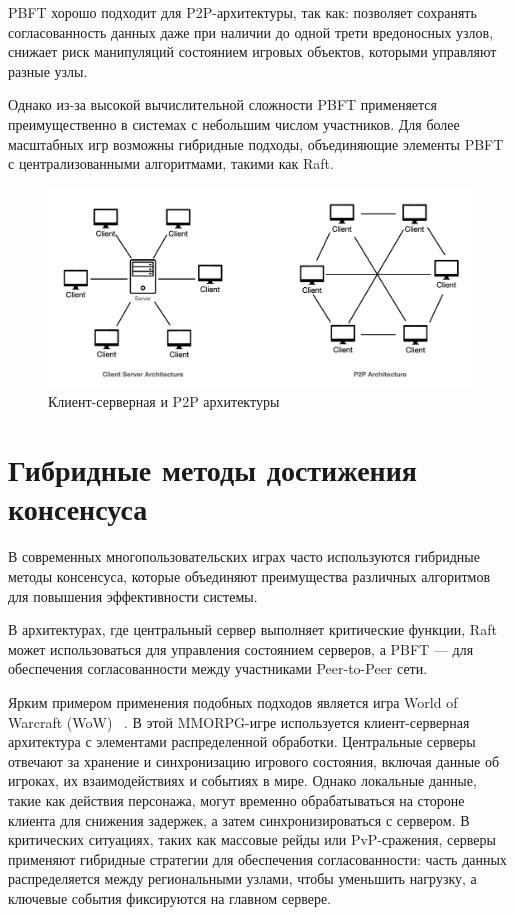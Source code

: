 PBFT хорошо подходит для P2P-архитектуры, так как: позволяет сохранять согласованность данных даже при наличии до одной трети вредоносных узлов, снижает риск манипуляций состоянием игровых объектов, которыми управляют разные узлы.

Однако из-за высокой вычислительной сложности PBFT применяется преимущественно в системах с небольшим числом участников. Для более масштабных игр возможны гибридные подходы, объединяющие элементы PBFT с централизованными алгоритмами, такими как Raft.

\begin{figure}[H]
	\centering
	\includegraphics[width=1\textwidth]{img/1.png}
	\caption{Клиент-серверная и P2P архитектуры}
	\label{img:2}
\end{figure}

\chapter{Гибридные методы достижения консенсуса}
В современных многопользовательских играх часто используются гибридные методы консенсуса, которые объединяют преимущества различных алгоритмов для повышения эффективности системы. 

В архитектурах, где центральный сервер выполняет критические функции, Raft может использоваться для управления состоянием серверов, а PBFT — для обеспечения согласованности между участниками Peer-to-Peer сети.

Ярким примером применения подобных подходов является игра World of Warcraft (WoW) ~\cite{b8}. В этой MMORPG-игре используется клиент-серверная архитектура с элементами распределенной обработки. Центральные серверы отвечают за хранение и синхронизацию игрового состояния, включая данные об игроках, их взаимодействиях и событиях в мире. Однако локальные данные, такие как действия персонажа, могут временно обрабатываться на стороне клиента для снижения задержек, а затем синхронизироваться с сервером. В критических ситуациях, таких как массовые рейды или PvP-сражения, серверы применяют гибридные стратегии для обеспечения согласованности: часть данных распределяется между региональными узлами, чтобы уменьшить нагрузку, а ключевые события фиксируются на главном сервере.

